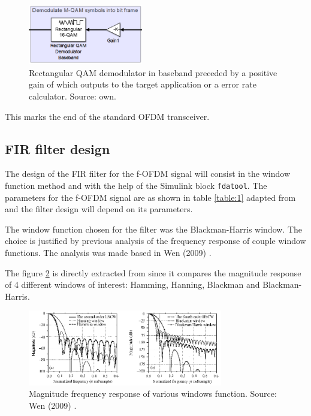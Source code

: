 \begin{figure}[h]
\begin{center}
\includegraphics[width=5cm]{images/block6.png}
\caption{Rectangular QAM demodulator in baseband preceded by a positive  gain of which outputs to the target application or a error rate calculator. Source: own.}
\label{fig:block6} 
\end{center}
\end{figure}

This marks the end of the standard OFDM transceiver. 

\subsection{FIR filter design}

The design of the FIR filter for the f-OFDM signal will consist in the window function method and with the help of the Simulink block \texttt{fdatool}. The parameters for the f-OFDM signal are as shown in table \ref{table:1} adapted from \cite{cheng2016filtered} and the filter design will depend on its parameters. 



The window function chosen for the filter was the Blackman-Harris window. The choice is justified by previous analysis of the frequency response of couple window functions. The analysis was made based in Wen (2009) \cite{wen2009hanning}.

The figure \ref{fig:win} is directly extracted from \cite{wen2009hanning} since it compares the magnitude response of 4 different windows of interest: Hamming, Hanning, Blackman and Blackman-Harris.


\begin{figure}[h]
\begin{center}
\includegraphics[width=8.5cm]{images/hbh.png}
\caption{Magnitude frequency response of various windows function. Source: Wen (2009) \cite{wen2009hanning}.}
\label{fig:win} 
\end{center}
\end{figure}

